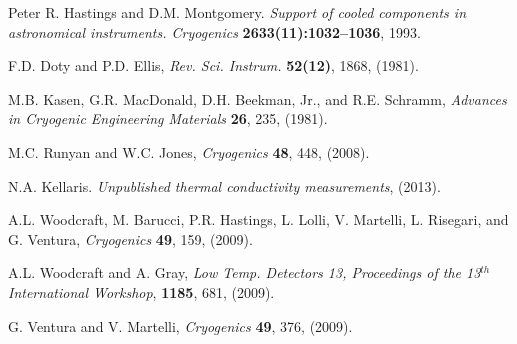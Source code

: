 \documentclass[final]{svjour2}
\begin{document}
\begin{thebibliography}{99}

Peter R. Hastings and D.M. Montgomery. {\it Support of cooled components in astronomical instruments. Cryogenics} \textbf{2633(11):1032–1036}, 1993.


F.D. Doty and P.D. Ellis, {\it Rev. Sci. Instrum.} \textbf{52(12)}, 1868, (1981).

M.B. Kasen, G.R. MacDonald, D.H. Beekman, Jr., and R.E. Schramm, {\it Advances in Cryogenic Engineering Materials} \textbf{26}, 235, (1981). 


M.C. Runyan and W.C. Jones, {\it Cryogenics} \textbf{48}, 448, (2008).

N.A. Kellaris. {\it Unpublished thermal conductivity measurements}, (2013).

A.L. Woodcraft, M. Barucci, P.R. Hastings, L. Lolli, V. Martelli, L. Risegari, and G. Ventura, {\it Cryogenics} \textbf{49}, 159, (2009).

A.L. Woodcraft and A. Gray, {\it Low Temp. Detectors 13, Proceedings of the 13$^{th}$ International Workshop}, \textbf{1185}, 681, (2009).

G. Ventura and V. Martelli, {\it Cryogenics} \textbf{49}, 376, (2009).

\end{thebibliography}
\end{document}
